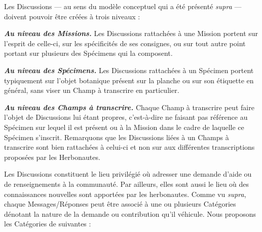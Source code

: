 \startchapter[title={Les discussions},reference=disc]

\startsection[title={Ancrage des discussions},reference=disc:ancrage]

Les Discussions --- au sens du modèle conceptuel qui a été présenté {\em supra} --- doivent pouvoir être créées à trois niveaux :

\startitemize
\item {\em\bf Au niveau des Missions.}
Les Discussions rattachées à une Mission portent sur l'esprit de celle-ci, sur les spécificités de ses consignes, ou sur tout autre point portant sur plusieurs des Spécimens qui la composent.
\item {\em\bf Au niveau des Spécimens.}
Les Discussions rattachées à un Spécimen portent typiquement sur l'objet botanique présent sur la planche ou sur son étiquette en général, sans viser un Champ à transcrire en particulier.
\item {\em\bf Au niveau des Champs à transcrire.}
Chaque Champ à transcrire peut faire l'objet de Discussions lui étant propres, c'est-à-dire ne faisant pas référence au Spécimen sur lequel il est présent ou à la Mission dans le cadre de laquelle ce Spécimen s'inscrit.
Remarquons que les Discussions liées à un Champs à transcrire sont bien rattachées à celui-ci et non sur aux différentes transcriptions proposées par les Herbonautes.
\stopitemize

\startsection[title={Caractérisation des messages & adresse à la communauté}]

\startsubsection[title={Catégorisation des Messages},reference=disc:categorie]

Les Discussions constituent le lieu privilégié où adresser une demande d'aide ou de renseignements à la communauté.
Par ailleurs, elles sont aussi le lieu où des connaissances nouvelles sont apportées par les herbonautes.
Comme vu {\em supra}, chaque Messages/Réponses peut être associé à une ou plusieurs Catégories dénotant la nature de la demande ou contribution qu'il véhicule.
Nous proposons les Catégories de suivantes :


